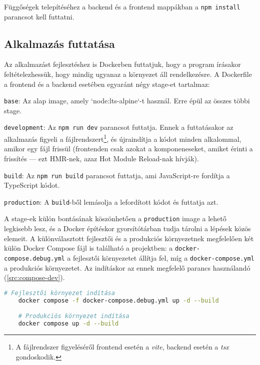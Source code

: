 Függőségek telepítéséhez a backend és a frontend mappákban a \texttt{npm install} parancsot kell futtatni.

\subsection{Alkalmazás futtatása}

Az alkalmazást fejlesztéshez is Dockerben futtatjuk, hogy a program írásakor feltételezhessük, hogy mindig ugyanaz a környezet áll rendelkezésre. A Dockerfile a frontend és a backend esetében egyaránt négy stage-et tartalmaz:

\begin{compactenum}
    \item \texttt{base}: Az alap image, amely `node:lts-alpine`-t használ. Erre épül az összes többi stage.
    \item \texttt{development}: Az \texttt{npm run dev} parancsot futtatja. Ennek a futtatásakor az alkalmazás figyeli a fájlrendszert\footnote{A fájlrendszer figyeléséről frontend esetén a \textit{vite}, backend esetén a \textit{tsx} gondoskodik.}, és újraindítja a kódot minden alkalommal, amikor egy fájl frissül (frontenden csak azokat a komponeneseket, amiket érinti a frissítés --- ezt HMR-nek, azaz Hot Module Reload-nak hívják).
    \item \texttt{build}: Az \texttt{npm run build} parancsot futtatja, ami JavaScript-re fordítja a TypeScript kódot.
    \item \texttt{production}: A \texttt{build}-ből lemásolja a lefordított kódot és futtatja azt.
\end{compactenum}

A stage-ek külön bontásának köszönhetően a \texttt{production} image a lehető legkisebb lesz, és a Docker építéskor gyorsítótárban tudja tárolni a lépések közös elemeit. A különválasztott fejlesztői és a produkciós környezetnek megfelelően két külön Docker Compose fájl is található a projektben: a \texttt{docker-compose.debug.yml} a fejlesztői környezetet állítja fel, míg a \texttt{docker-compose.yml} a produkciós környezetet. Az indításkor az ennek megfelelő parancs használandó (\ref{src:compose-dev}).

\begin{lstlisting}[language={bash}]
    # Fejlesztői környezet indítása
    docker compose -f docker-compose.debug.yml up -d --build

    # Produkciós környezet indítása
    docker compose up -d --build
\end{lstlisting}


